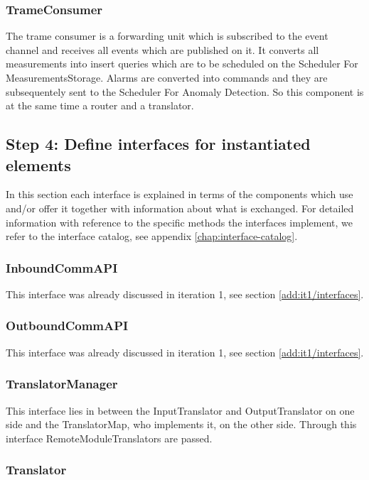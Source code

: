 \subsubsection{TrameConsumer}

\npar The trame consumer is a forwarding unit which is subscribed to the event
channel and receives all events which are published on it. It converts all
measurements into insert queries which are to be scheduled on the Scheduler For
MeasurementsStorage. Alarms are converted into commands and they are
subsequentely sent to the Scheduler For Anomaly Detection. So this component is
at the same time a router and a translator.

\subsection{Step 4: Define interfaces for instantiated elements}
\label{add:it2/interfaces}

\npar In this section each interface is explained in terms of the components
which use and/or offer it together with information about what is exchanged. For
detailed information with reference to the specific methods the interfaces
implement, we refer to the interface catalog, see appendix
\ref{chap:interface-catalog}.

\subsubsection{InboundCommAPI}

\npar This interface was already discussed in iteration 1, see section
\ref{add:it1/interfaces}.

\subsubsection{OutboundCommAPI}

\npar This interface was already discussed in iteration 1, see section
\ref{add:it1/interfaces}.

\subsubsection{TranslatorManager}

\npar This interface lies in between the InputTranslator and OutputTranslator
on one side and the TranslatorMap, who implements it, on the other side.
Through this interface RemoteModuleTranslators are passed.

\subsubsection{Translator}

